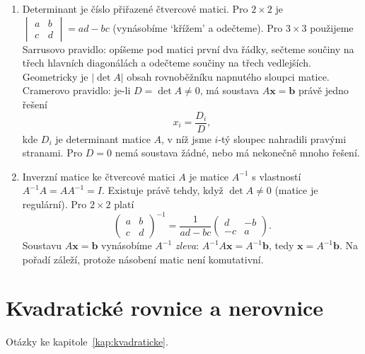 \begin{enumerate}[label=\textbf{\arabic*.}, leftmargin=*, itemsep=0.8em]
  \item {}
  Determinant je číslo přiřazené čtvercové matici. Pro $2\times 2$ je $\begin{vmatrix} a & b\\ c & d \end{vmatrix} = ad - bc$ (vynásobíme `křížem' a odečteme). Pro $3\times 3$ použijeme Sarrusovo pravidlo: opíšeme pod matici první dva řádky, sečteme součiny na třech hlavních diagonálách a odečteme součiny na třech vedlejších. Geometricky je $|\det A|$ obsah rovnoběžníku napnutého sloupci matice. Cramerovo pravidlo: je-li $D = \det A\neq 0$, má soustava $A\mathbf{x} = \mathbf{b}$ právě jedno řešení
  \begin{equation*}
    x_i = \frac{D_i}{D},
  \end{equation*}
  kde $D_i$ je determinant matice $A$, v níž jsme $i$-tý sloupec nahradili pravými stranami. Pro $D = 0$ nemá soustava žádné, nebo má nekonečně mnoho řešení. 

  \item {}
  Inverzní matice ke čtvercové matici $A$ je matice $A^{-1}$ s vlastností $A^{-1}A = AA^{-1} = I$. Existuje právě tehdy, když $\det A\neq 0$ (matice je regulární). Pro $2\times 2$ platí
  \begin{equation*}
    \begin{pmatrix} a & b\\ c & d \end{pmatrix}^{-1} = \frac{1}{ad - bc}\begin{pmatrix} d & -b\\ -c & a \end{pmatrix}.
  \end{equation*}
  Soustavu $A\mathbf{x} = \mathbf{b}$ vynásobíme $A^{-1}$ \emph{zleva}: $A^{-1}A\mathbf{x} = A^{-1}\mathbf{b}$, tedy $\mathbf{x} = A^{-1}\mathbf{b}$. Na pořadí záleží, protože násobení matic není komutativní. 
\end{enumerate}

\section{Kvadratické rovnice a nerovnice}

Otázky ke kapitole~\ref{kap:kvadraticke}.

